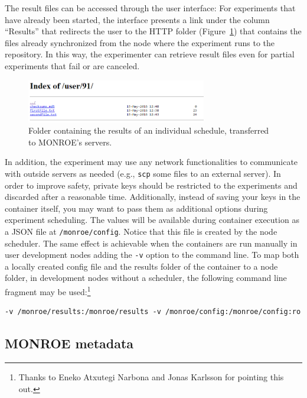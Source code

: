 \documentclass[a4paper,10pt]{article}
\newcommand{\monroe}{MONROE}
\newcommand{\identifier}[1]{{\texttt{\small{#1}}}}
\begin{document}
The result files can be accessed through the user interface:
For experiments that have already been started, the interface presents a link under the column ``Results'' that redirects the user to the HTTP folder (Figure~\ref{fig:ResultsRetrieval}) that contains the files already synchronized from the node where the experiment runs to the repository.
In this way, the experimenter can retrieve result files even for partial experiments that fail or are canceled.

\begin{figure}[tp]
	\centering
	\includegraphics[width=0.7\textwidth]{ResultsRetrieval.png}
	\caption{Folder containing the results of an individual schedule, transferred to \monroe{}'s servers.}
	\label{fig:ResultsRetrieval}
	\end{figure}

In addition, the experiment may use any network functionalities to communicate with outside servers as needed (e.g., \identifier{scp} some files to an external server).
In order to improve safety, private keys should be restricted to the experiments and discarded after a reasonable time.
Additionally, instead of saving your keys in the container itself, you may want to pass them as additional options during experiment scheduling.
The values will be available during container execution as a JSON file at \identifier{/monroe/config}.
Notice that this file is created by the node scheduler.
The same effect is achievable when the containers are run manually in user development nodes adding the \identifier{-v} option to the command line.
To map both a locally created config file and the results folder of the container to a node folder, in development nodes without a scheduler, the following command line fragment may be used:\footnote{Thanks to Eneko Atxutegi Narbona and Jonas Karlsson for pointing this out.}
\begin{verbatim}
-v /monroe/results:/monroe/results -v /monroe/config:/monroe/config:ro
\end{verbatim}

\subsection{\monroe{} metadata}
\end{document}
